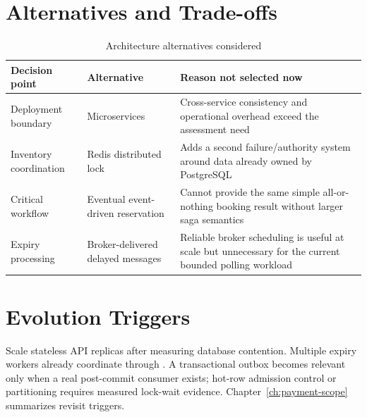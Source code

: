 \section{Alternatives and Trade-offs}
\begin{table}[H]
\centering
\caption{Architecture alternatives considered}
\begin{tabularx}{\textwidth}{p{}p{}Y}
\toprule
\textbf{Decision point} & \textbf{Alternative} & \textbf{Reason not selected now} \\
\midrule
Deployment boundary & Microservices & Cross-service consistency and operational overhead exceed the assessment need \\
Inventory coordination & Redis distributed lock & Adds a second failure/authority system around data already owned by PostgreSQL \\
Critical workflow & Eventual event-driven reservation & Cannot provide the same simple all-or-nothing booking result without larger saga semantics \\
Expiry processing & Broker-delivered delayed messages & Reliable broker scheduling is useful at scale but unnecessary for the current bounded polling workload \\
\bottomrule
\end{tabularx}
\end{table}

\section{Evolution Triggers}
Scale stateless API replicas after measuring database contention. Multiple
expiry workers already coordinate through . A
transactional outbox becomes relevant only when a real post-commit consumer
exists; hot-row admission control or partitioning requires measured lock-wait
evidence. Chapter~\ref{ch:payment-scope} summarizes revisit triggers.
